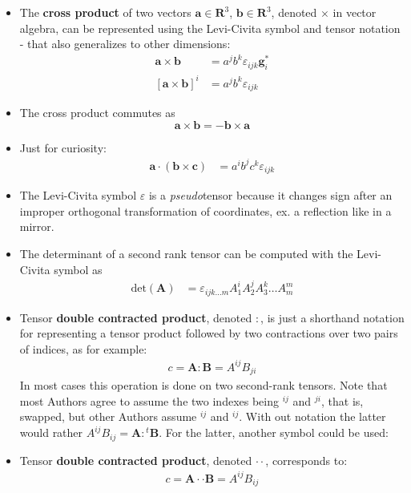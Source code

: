\documentclass{digitaldynamics}
\def\vect#1{\bm{#1}}
\def\vcovar#1{{\bm{#1}}^*}
\def\tensor#1{\bm{#1}}
\begin{document}
\begin{itemize}
	\item The \textbf{cross product} of two vectors $\vect{a} \in \mathbf{R}^3$, $\vect{b} \in \mathbf{R}^3$, denoted $\times$ in vector algebra, can be represented using the Levi-Civita symbol and tensor notation - that also generalizes to other dimensions:
	\begin{align}
		\vect{a} \times \vect{b} &= a^j b^k \varepsilon_{i j k} \vcovar{g}_i \\
		[\vect{a} \times \vect{b}]^i &= a^j b^k \varepsilon_{i j k}
	\end{align}
	
	\item The cross product commutes as
	\[
	\vect{a} \times \vect{b} = - \vect{b} \times \vect{a}
	\]
	
	\item Just for curiosity:
	\begin{align}
		\vect{a} \cdot (\vect{b} \times \vect{c}) &= a^i b^j c^k \varepsilon_{i j k}
	\end{align}
	
	\item The Levi-Civita symbol $\varepsilon$ is a \textit{pseudo}tensor because it changes sign after an improper orthogonal transformation of coordinates, ex. a reflection like in a mirror.
	
	\item The determinant of a second rank tensor can be computed with the Levi-Civita symbol as
	\begin{align}
		\mathrm{det}(\tensor{A}) &= \varepsilon_{i j k \ldots m} A^i_1 A^j_2 A^k_3 \ldots A^m_m
	\end{align}
	
	
	\item Tensor \textbf{double contracted product}, denoted $:$, is just a shorthand notation for representing a tensor product followed by two contractions over two pairs of indices, as for example:
	\begin{align}
	 c = \tensor{A} : \tensor{B} = A^{ij} B_{ji} 
	\label{eq:tensordoublecontractedproduct}
	\end{align}
	In most cases this operation is done on two second-rank tensors. 
	Note that most Authors agree to assume the two indexes being ${}^{ij}$ and ${}^{ji}$, that is, swapped, but other Authors assume ${}^{ij}$ and ${}^{ij}$. With out notation the latter would rather $ A^{ij} B_{ij} = \tensor{A} : {}^t\tensor{B}$. For the latter, another symbol could be used:
	
	\item Tensor \textbf{double contracted product}, denoted $\cdot \cdot$, corresponds to:
	\begin{align}
	 c = \tensor{A} \cdot \cdot \tensor{B} = A^{ij} B_{ij} 
	\label{eq:tensordoublecontractedproductt}
	\end{align}


\end{itemize}
\end{document}
